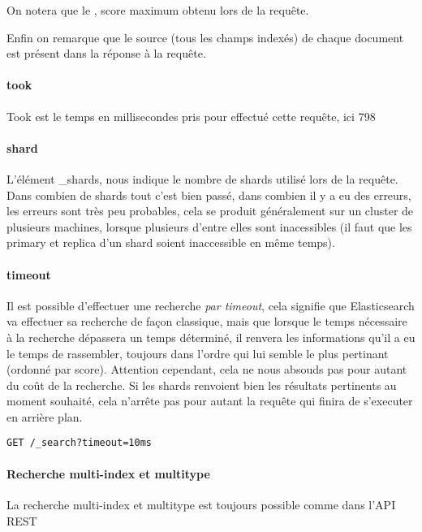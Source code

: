 On notera que le , score maximum obtenu lors de la requête.

Enfin on remarque que le source (tous les champs indexés) de chaque document est présent
dans la réponse à la requête.

\paragraph{took}
Took est le temps en millisecondes pris pour effectué cette requête, ici 798

\paragraph{shard}
L'élément \_shards, nous indique le nombre de shards utilisé lors de la requête. 
Dans combien de shards tout c'est bien passé, dans combien il y a eu des erreurs,
les erreurs sont très peu probables, cela se produit généralement sur un cluster 
de plusieurs machines, lorsque plusieurs d'entre elles sont inacessibles (il faut 
que les primary et replica d'un shard soient inaccessible en même temps).

\paragraph{timeout}
Il est possible d'effectuer une recherche \textit{par timeout}, cela signifie que 
Elasticsearch va effectuer sa recherche de façon classique, mais que lorsque le temps
nécessaire à la recherche dépassera un temps déterminé, il renvera les informations 
qu'il a eu le temps de rassembler, toujours dans l'ordre qui lui semble le plus pertinant
(ordonné par score). Attention cependant, cela ne nous absouds pas pour autant du
coût de la recherche. Si les shards renvoient bien les résultats pertinents au moment
souhaité, cela n'arrête pas pour autant la requête qui finira de s'executer en arrière
plan.

\begin{lstlisting}[style=code,label={lst:APIsearchemptyexample3},caption={Une recherche "vide" avec timeout}]
GET /_search?timeout=10ms
\end{lstlisting}


\paragraph{Recherche multi-index et multitype}
La recherche multi-index et multitype est toujours possible comme dans l'API REST

